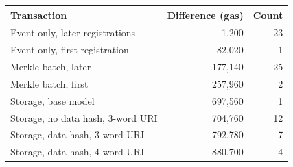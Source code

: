 \begin{tabular}{lrr}
\toprule
Transaction & Difference (gas) & Count \\
\midrule
Event-only, later registrations & 1{,}200 & 23 \\
Event-only, first registration & 82{,}020 & 1 \\
Merkle batch, later & 177{,}140 & 25 \\
Merkle batch, first & 257{,}960 & 2 \\
Storage, base model & 697{,}560 & 1 \\
Storage, no data hash, 3-word URI & 704{,}760 & 12 \\
Storage, data hash, 3-word URI & 792{,}780 & 7 \\
Storage, data hash, 4-word URI & 880{,}700 & 4 \\
\bottomrule
\end{tabular}

